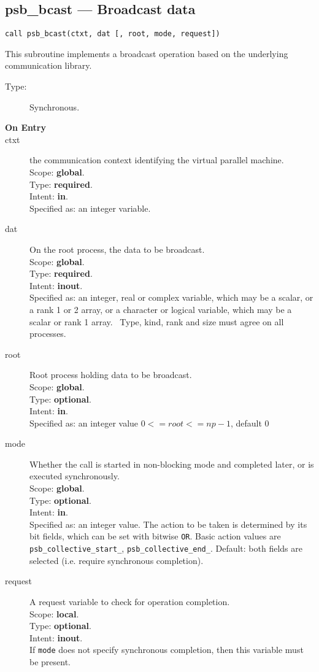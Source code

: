\clearpage\subsection{psb\_bcast --- Broadcast data}

\begin{verbatim}
call psb_bcast(ctxt, dat [, root, mode, request])
\end{verbatim}

This subroutine implements a broadcast operation based on the
underlying communication library. 
\begin{description}
\item[Type:] Synchronous.
\item[\bf  On Entry ]
\item[ctxt] the communication context identifying the virtual
  parallel machine.\\
Scope: {\bf global}.\\
Type: {\bf required}.\\
Intent: {\bf in}.\\
Specified as: an integer variable.
\item[dat] On the root process, the data to be broadcast.\\
Scope: {\bf global}.\\
Type: {\bf required}.\\
Intent: {\bf inout}.\\
Specified as: an integer, real or complex variable, which may be a
scalar, or a rank 1 or 2 array, or a character or logical variable,
which may be a scalar or rank 1 array. \
Type, kind, rank and size must agree on all processes.
\item[root] Root process holding data to be broadcast.\\
Scope: {\bf global}.\\
Type: {\bf optional}.\\
Intent: {\bf in}.\\
Specified as: an integer value $0<= root <= np-1$, default 0 \
\item[mode] Whether the call is started in non-blocking mode and completed
  later, or is executed synchronously.\\
Scope: {\bf global}.\\
Type: {\bf optional}.\\
Intent: {\bf in}.\\
Specified as: an integer value. The action to be taken is determined
by its bit fields, which can be set with bitwise \verb|OR|. Basic
action values are \verb|psb_collective_start_|, \verb|psb_collective_end_|.
Default:  both fields are selected (i.e. require synchronous completion).\\
\item[request] A request variable to check for operation completion.\\
Scope: {\bf local}.\\
Type: {\bf optional}.\\
Intent: {\bf inout}.\\
If \verb|mode| does not specify synchronous completion, then this
variable must be present.
\end{description}


